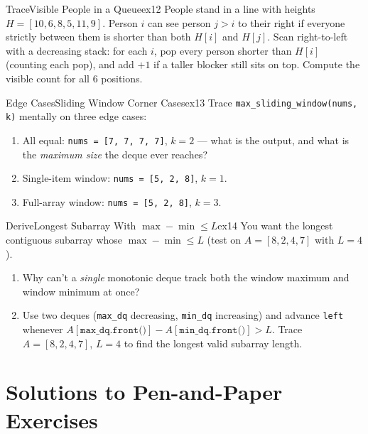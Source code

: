 \documentclass[11pt,a4paper]{article}
\theoremstyle{definition}
\begin{document}
\begin{tryitbox}{Trace}{Visible People in a Queue}{ex12}
People stand in a line with heights $H = [10, 6, 8, 5, 11, 9]$. Person $i$ can see person $j > i$ to their right if everyone strictly between them is shorter than both $H[i]$ and $H[j]$. Scan right-to-left with a decreasing stack: for each $i$, pop every person shorter than $H[i]$ (counting each pop), and add $+1$ if a taller blocker still sits on top. Compute the visible count for all $6$ positions.
\end{tryitbox}

\begin{tryitbox}{Edge Cases}{Sliding Window Corner Cases}{ex13}
Trace \texttt{max\_sliding\_window(nums, k)} mentally on three edge cases:
\begin{enumerate}
    \item All equal: \texttt{nums = [7, 7, 7, 7]}, $k = 2$ --- what is the output, and what is the \emph{maximum size} the deque ever reaches?
    \item Single-item window: \texttt{nums = [5, 2, 8]}, $k = 1$.
    \item Full-array window: \texttt{nums = [5, 2, 8]}, $k = 3$.
\end{enumerate}
\end{tryitbox}

\begin{tryitbox}{Derive}{Longest Subarray With $\max - \min \le L$}{ex14}
You want the longest contiguous subarray whose $\max - \min \le L$ (test on $A = [8, 2, 4, 7]$ with $L = 4$).
\begin{enumerate}
    \item Why can't a \emph{single} monotonic deque track both the window maximum and window minimum at once?
    \item Use two deques (\texttt{max\_dq} decreasing, \texttt{min\_dq} increasing) and advance \texttt{left} whenever $A[\texttt{max\_dq.front()}] - A[\texttt{min\_dq.front()}] > L$. Trace $A = [8, 2, 4, 7]$, $L = 4$ to find the longest valid subarray length.
\end{enumerate}
\end{tryitbox}

\section*{Solutions to Pen-and-Paper Exercises}
\end{document}
